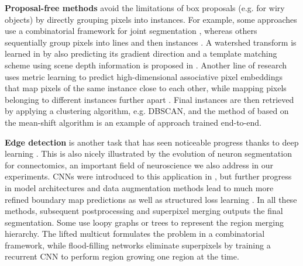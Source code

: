 \textbf{Proposal-free methods} avoid the limitations of box proposals (e.g. for wiry objects) by directly grouping pixels into instances. For example, some approaches use a combinatorial framework for joint segmentation \cite{kirillov2017instancecut}, whereas others sequentially group pixels into lines and then instances \cite{liu2017sgn}.
A watershed transform is learned in \cite{bai2017deep} by also predicting its gradient direction and a template matching scheme using scene depth information is proposed in \cite{uhrig2016pixel}.
Another line of research uses metric learning to predict high-dimensional associative pixel embeddings that map pixels of the same instance close to each other, while mapping pixels belonging to different instances further apart \cite{fathi2017semantic,newell2017associative,de2017semantic,novotny2018semi,kulikov2018instance}. 
Final instances are then retrieved by applying a clustering algorithm, e.g. DBSCAN, and the method of \cite{kong2018recurrent} based on the mean-shift algorithm is an example of approach trained end-to-end.

\textbf{Edge detection} is another task that has seen noticeable progress thanks to deep learning \cite{xie2015holistically,kokkinos2015pushing}. This is also nicely illustrated by the evolution of neuron segmentation for connectomics, an important field of neuroscience we also address in our experiments. CNNs were introduced to this application in \cite{jain2007supervised}, but further progress in model architectures and data augmentation methods lead to much more refined boundary map predictions \cite{lee2017superhuman,meirovitch2016multi,ciresan2012deep} as well as structured loss learning \cite{funke2018large,turaga2009maximin}. 
In all these methods, subsequent postprocessing and superpixel merging outputs the final segmentation. Some use loopy graphs \cite{kaynig2015large,krasowski2015improving} or trees \cite{meirovitch2016multi,liu2016sshmt,liu2014modular,funke2015learning,uzunbas2016efficient} to represent the region merging hierarchy. The lifted multicut \cite{beier2017multicut} formulates the problem in a combinatorial framework, while flood-filling networks \cite{januszewski2018high} eliminate superpixels by training a recurrent CNN to perform region growing one region at the time.

